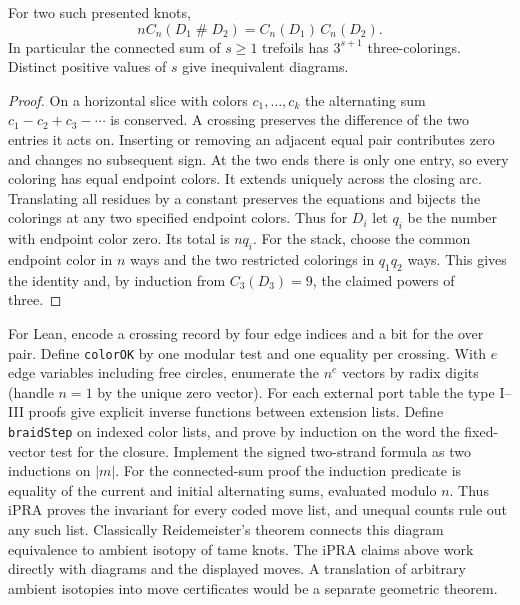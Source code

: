 \begin{proposition}\label{idx-knots143}
For two such presented knots,
\[
 n C_n(D_1\mathbin{\#}D_2)=C_n(D_1)\,C_n(D_2).
\]
In particular the connected sum of $s\ge1$ trefoils has $3^{s+1}$
three-colorings. Distinct positive values of $s$ give inequivalent
diagrams.
\end{proposition}
\begin{proof}
On a horizontal slice with colors $c_1,\ldots,c_k$ the alternating sum
$c_1-c_2+c_3-\cdots$ is conserved. A crossing preserves the difference
of the two entries it acts on. Inserting or removing an adjacent equal
pair contributes zero and changes no subsequent sign. At the two ends
there is only one entry, so every coloring has equal endpoint colors.
It extends uniquely across the closing arc. Translating all residues by
a constant preserves the equations and bijects the colorings at any two
specified endpoint colors. Thus for $D_i$ let $q_i$ be the number with
endpoint color zero. Its total is $nq_i$. For the stack, choose the
common endpoint color in $n$ ways and the two restricted colorings in
$q_1q_2$ ways. This gives the identity and, by induction from
$C_3(D_3)=9$, the claimed powers of three.
\end{proof}

For Lean, encode a crossing record by four edge indices and a bit for
the over pair. Define \texttt{colorOK} by one modular test and one
equality per crossing. With $e$ edge variables including free circles,
enumerate the $n^e$ vectors by radix digits (handle $n=1$ by the unique
zero vector). For each external port table the type I--III proofs give
explicit inverse functions between extension lists. Define
\texttt{braidStep} on indexed color lists, and prove by induction on
the word the fixed-vector test for the closure. Implement the signed
two-strand formula as two inductions on $|m|$. For the connected-sum
proof the induction predicate is equality of the current and initial
alternating sums, evaluated modulo $n$. Thus iPRA proves the invariant
for every coded move list, and unequal counts rule out any such list.
Classically Reidemeister's theorem connects this diagram equivalence to
ambient isotopy of tame knots. The iPRA claims above work directly with
diagrams and the displayed moves. A translation of arbitrary ambient
isotopies into move certificates would be a separate geometric theorem.

